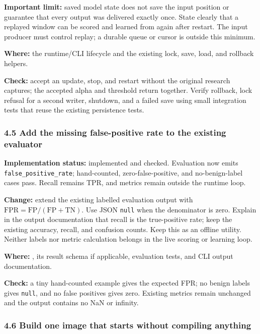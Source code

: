 \documentclass[11pt,a4paper]{article}
\begin{document}
\textbf{Important limit:} saved model state does not save the input position or
guarantee that every output was delivered exactly once. State clearly that a
replayed window can be scored and learned from again after restart. The input
producer must control replay; a durable queue or cursor is outside this minimum.

\textbf{Where:} the runtime/CLI lifecycle and the existing
 lock, save, load, and rollback helpers.

\textbf{Check:} accept an update, stop, and restart without the original research
captures; the accepted alpha and threshold return together. Verify rollback,
lock refusal for a second writer, shutdown, and a failed save using small
integration tests that reuse the existing persistence tests.

\subsubsection*{4.5 Add the missing false-positive rate to the existing evaluator}

\textbf{Implementation status:} implemented and checked. Evaluation now emits
\texttt{false\_positive\_rate}; hand-counted, zero-false-positive, and no-benign-label
cases pass. Recall remains TPR, and metrics remain outside the runtime loop.

\textbf{Change:} extend the existing labelled evaluation output with
\(\mathrm{FPR}=\mathrm{FP}/(\mathrm{FP}+\mathrm{TN})\). Use JSON
\texttt{null} when the denominator is zero. Explain in the output documentation
that recall is the true-positive rate; keep the existing accuracy, recall, and
confusion counts. Keep this as an offline utility. Neither labels nor metric
calculation belongs in the live scoring or learning loop.

\textbf{Where:} , its result
schema if applicable, evaluation tests, and CLI output documentation.

\textbf{Check:} a tiny hand-counted example gives the expected FPR; no benign
labels gives \texttt{null}, and no false positives gives zero. Existing metrics
remain unchanged and the output contains no NaN or infinity.

\subsubsection*{4.6 Build one image that starts without compiling anything}
\end{document}
